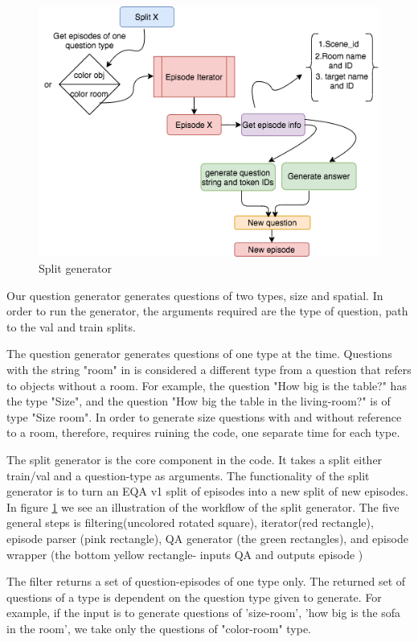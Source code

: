 \begin{figure}[H]
\centering
\includegraphics[scale=0.5]{images/generator.png}
\caption{Split generator}
\label{fig:generator}
\end{figure}



 Our question generator generates questions of two types, size and spatial. In order to run the generator, the arguments required are the type of question, path to the val and train splits. 


 The question generator generates questions of one type at the time. Questions with the string "room" in is considered a different type from a question that refers to objects without a room. For example, the question "How big is the table?" has the type "Size", and the question "How big the table in the living-room?" is of type "Size room". In order to generate size questions with and without reference to a room, therefore, requires ruining the code, one separate time for each type. 

The split generator is the core component in the code. It takes a split either train/val and a question-type as arguments. The functionality of the split generator is to turn an EQA v1 split of episodes into a new split of new episodes. In figure \ref{fig:generator} we see an illustration of the workflow of the split generator. The five general steps is filtering(uncolored rotated square), iterator(red rectangle), episode parser (pink rectangle),  QA generator (the green rectangles), and  episode wrapper (the bottom yellow rectangle- inputs QA and outputs episode )  

The filter returns a set of question-episodes of one type only. The returned set of questions of a type is dependent on the question type given to generate. For example, if the input is to generate questions of 'size-room', 'how big is the sofa in the room', we take only the questions of "color-room" type. 

